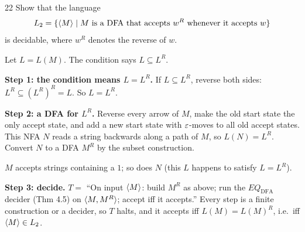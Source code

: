 \begin{question}{22}
Show that the language
\[L_2=\{\langle M\rangle\mid M \text{ is a DFA that accepts } w^R \text{ whenever it accepts } w\}\]
is decidable, where $w^R$ denotes the reverse of $w$.
\end{question}
\begin{soln}
Let $L=L(M)$. The condition says $L\subseteq L^R$.

\textbf{Step 1: the condition means $L=L^R$.} If $L\subseteq L^R$, reverse both sides: $L^R\subseteq (L^R)^R=L$. So $L=L^R$.

\textbf{Step 2: a DFA for $L^R$.} Reverse every arrow of $M$, make the old start state the only accept state, and add a new start state with $\varepsilon$-moves to all old accept states. This NFA $N$ reads a string backwards along a path of $M$, so $L(N)=L^R$. Convert $N$ to a DFA $M^R$ by the subset construction.

\begin{center}

{\footnotesize $M$ accepts strings containing a $1$; so does $N$ (this $L$ happens to satisfy $L=L^R$).}
\end{center}

\textbf{Step 3: decide.}
$T=$ ``On input $\langle M\rangle$: build $M^R$ as above; run the $\mathit{EQ}_{\mathrm{DFA}}$ decider (Thm 4.5) on $\langle M,M^R\rangle$; accept iff it accepts.''
Every step is a finite construction or a decider, so $T$ halts, and it accepts iff $L(M)=L(M)^R$, i.e.\ iff $\langle M\rangle\in L_2$.
\end{soln}

